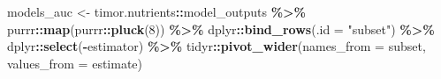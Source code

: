 \documentclass[
]{book}
\newenvironment{Shaded}{\begin{snugshade}}{\end{snugshade}}
\newcommand{\AttributeTok}[1]{\textcolor[rgb]{0.13,0.29,0.53}{#1}}
\newcommand{\DecValTok}[1]{\textcolor[rgb]{0.00,0.00,0.81}{#1}}
\newcommand{\FunctionTok}[1]{\textcolor[rgb]{0.13,0.29,0.53}{\textbf{#1}}}
\newcommand{\NormalTok}[1]{#1}
\newcommand{\OtherTok}[1]{\textcolor[rgb]{0.56,0.35,0.01}{#1}}
\newcommand{\SpecialCharTok}[1]{\textcolor[rgb]{0.81,0.36,0.00}{\textbf{#1}}}
\newcommand{\StringTok}[1]{\textcolor[rgb]{0.31,0.60,0.02}{#1}}
\begin{document}
\begin{Shaded}
\begin{Highlighting}[]
\NormalTok{models\_auc }\OtherTok{\textless{}{-}}
\NormalTok{  timor.nutrients}\SpecialCharTok{::}\NormalTok{model\_outputs }\SpecialCharTok{\%\textgreater{}\%}
\NormalTok{  purrr}\SpecialCharTok{::}\FunctionTok{map}\NormalTok{(purrr}\SpecialCharTok{::}\FunctionTok{pluck}\NormalTok{(}\DecValTok{8}\NormalTok{)) }\SpecialCharTok{\%\textgreater{}\%}
\NormalTok{  dplyr}\SpecialCharTok{::}\FunctionTok{bind\_rows}\NormalTok{(}\AttributeTok{.id =} \StringTok{"subset"}\NormalTok{) }\SpecialCharTok{\%\textgreater{}\%}
\NormalTok{  dplyr}\SpecialCharTok{::}\FunctionTok{select}\NormalTok{(}\SpecialCharTok{{-}}\NormalTok{estimator) }\SpecialCharTok{\%\textgreater{}\%}
\NormalTok{  tidyr}\SpecialCharTok{::}\FunctionTok{pivot\_wider}\NormalTok{(}\AttributeTok{names\_from =}\NormalTok{ subset, }\AttributeTok{values\_from =}\NormalTok{ estimate)}



\end{Highlighting}
\end{Shaded}
\end{document}
